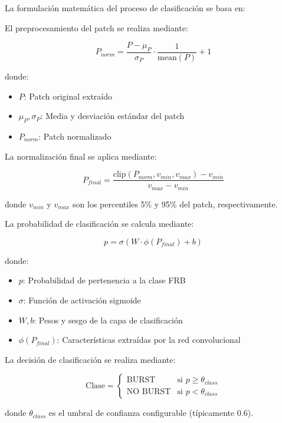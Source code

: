 La formulación matemática del proceso de clasificación se basa en:

El preprocesamiento del patch se realiza mediante:

\[
P_{norm} = \frac{P - \mu_P}{\sigma_P} \cdot \frac{1}{\text{mean}(P)} + 1
\]

donde:
\begin{itemize}
    \item $P$: Patch original extraído
    \item $\mu_P, \sigma_P$: Media y desviación estándar del patch
    \item $P_{norm}$: Patch normalizado
\end{itemize}

La normalización final se aplica mediante:

\[
P_{final} = \frac{\text{clip}(P_{norm}, v_{min}, v_{max}) - v_{min}}{v_{max} - v_{min}}
\]

donde $v_{min}$ y $v_{max}$ son los percentiles 5\% y 95\% del patch, respectivamente.

La probabilidad de clasificación se calcula mediante:

\[
p = \sigma(W \cdot \phi(P_{final}) + b)
\]

donde:
\begin{itemize}
    \item $p$: Probabilidad de pertenencia a la clase FRB
    \item $\sigma$: Función de activación sigmoide
    \item $W, b$: Pesos y sesgo de la capa de clasificación
    \item $\phi(P_{final})$: Características extraídas por la red convolucional
\end{itemize}

La decisión de clasificación se realiza mediante:

\[
\text{Clase} = \begin{cases} 
\text{BURST} & \text{si } p \geq \theta_{class} \\
\text{NO BURST} & \text{si } p < \theta_{class}
\end{cases}
\]

donde $\theta_{class}$ es el umbral de confianza configurable (típicamente 0.6).

